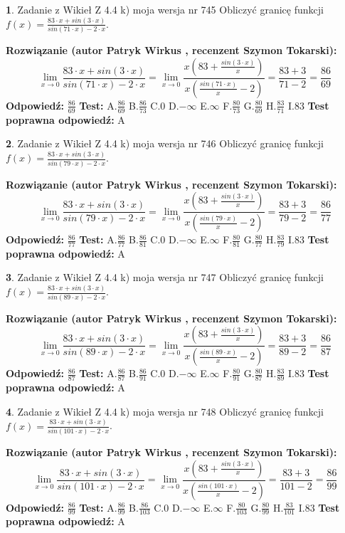 \documentclass[12pt, a4paper]{article}
\theoremstyle{definition} %
\newtheorem{zad}{}
\newcommand{\zadStart}[1]{\begin{zad}#1\newline}
\newcommand{\zadStop}{\end{zad}}
\newcommand{\rozwStart}[2]{\noindent \textbf{Rozwiązanie (autor #1 , recenzent #2): }\newline}
\newcommand{\rozwStop}{\newline}
\newcommand{\odpStart}{\noindent \textbf{Odpowiedź:}\newline}
\newcommand{\odpStop}{\newline}
\newcommand{\testStart}{\noindent \textbf{Test:}\newline}
\newcommand{\testStop}{\newline}
\newcommand{\kluczStart}{\noindent \textbf{Test poprawna odpowiedź:}\newline}
\newcommand{\kluczStop}{\newline}
\begin{document}
\zadStart{Zadanie z Wikieł Z 4.4 k) moja wersja nr 745}
Obliczyć granicę funkcji $f(x)=\frac{83\cdot x +sin(3\cdot x)}{sin(71\cdot x) -2\cdot x}$.
\zadStop
\rozwStart{Patryk Wirkus}{Szymon Tokarski}
$$\lim\limits_{x\to 0}\frac{83\cdot x +sin(3\cdot x)}{sin(71\cdot x) -2\cdot x}
=\lim\limits_{x\to 0}\frac{x(83+\frac{sin(3\cdot x)}{x})}{x(\frac{sin(71\cdot x)}{x}-2)}
=\frac{83+3}{71-2} = \frac{86}{69}$$
\rozwStop
\odpStart
$\frac{86}{69}$
\odpStop
\testStart
A.$\frac{86}{69}$
B.$\frac{86}{73}$
C.$0$
D.$-\infty$
E.$\infty$
F.$\frac{80}{73}$
G.$\frac{80}{69}$
H.$\frac{83}{71}$
I.$83$
\testStop
\kluczStart
A
\kluczStop



\zadStart{Zadanie z Wikieł Z 4.4 k) moja wersja nr 746}
Obliczyć granicę funkcji $f(x)=\frac{83\cdot x +sin(3\cdot x)}{sin(79\cdot x) -2\cdot x}$.
\zadStop
\rozwStart{Patryk Wirkus}{Szymon Tokarski}
$$\lim\limits_{x\to 0}\frac{83\cdot x +sin(3\cdot x)}{sin(79\cdot x) -2\cdot x}
=\lim\limits_{x\to 0}\frac{x(83+\frac{sin(3\cdot x)}{x})}{x(\frac{sin(79\cdot x)}{x}-2)}
=\frac{83+3}{79-2} = \frac{86}{77}$$
\rozwStop
\odpStart
$\frac{86}{77}$
\odpStop
\testStart
A.$\frac{86}{77}$
B.$\frac{86}{81}$
C.$0$
D.$-\infty$
E.$\infty$
F.$\frac{80}{81}$
G.$\frac{80}{77}$
H.$\frac{83}{79}$
I.$83$
\testStop
\kluczStart
A
\kluczStop



\zadStart{Zadanie z Wikieł Z 4.4 k) moja wersja nr 747}
Obliczyć granicę funkcji $f(x)=\frac{83\cdot x +sin(3\cdot x)}{sin(89\cdot x) -2\cdot x}$.
\zadStop
\rozwStart{Patryk Wirkus}{Szymon Tokarski}
$$\lim\limits_{x\to 0}\frac{83\cdot x +sin(3\cdot x)}{sin(89\cdot x) -2\cdot x}
=\lim\limits_{x\to 0}\frac{x(83+\frac{sin(3\cdot x)}{x})}{x(\frac{sin(89\cdot x)}{x}-2)}
=\frac{83+3}{89-2} = \frac{86}{87}$$
\rozwStop
\odpStart
$\frac{86}{87}$
\odpStop
\testStart
A.$\frac{86}{87}$
B.$\frac{86}{91}$
C.$0$
D.$-\infty$
E.$\infty$
F.$\frac{80}{91}$
G.$\frac{80}{87}$
H.$\frac{83}{89}$
I.$83$
\testStop
\kluczStart
A
\kluczStop



\zadStart{Zadanie z Wikieł Z 4.4 k) moja wersja nr 748}
Obliczyć granicę funkcji $f(x)=\frac{83\cdot x +sin(3\cdot x)}{sin(101\cdot x) -2\cdot x}$.
\zadStop
\rozwStart{Patryk Wirkus}{Szymon Tokarski}
$$\lim\limits_{x\to 0}\frac{83\cdot x +sin(3\cdot x)}{sin(101\cdot x) -2\cdot x}
=\lim\limits_{x\to 0}\frac{x(83+\frac{sin(3\cdot x)}{x})}{x(\frac{sin(101\cdot x)}{x}-2)}
=\frac{83+3}{101-2} = \frac{86}{99}$$
\rozwStop
\odpStart
$\frac{86}{99}$
\odpStop
\testStart
A.$\frac{86}{99}$
B.$\frac{86}{103}$
C.$0$
D.$-\infty$
E.$\infty$
F.$\frac{80}{103}$
G.$\frac{80}{99}$
H.$\frac{83}{101}$
I.$83$
\testStop
\kluczStart
A
\kluczStop
\end{document}
